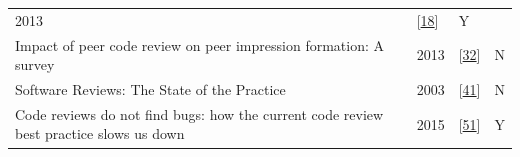 \documentclass[]{book}
\begin{document}
\begin{longtable}[]{@{}llll@{}}
\begin{minipage}[t]{0.04\columnwidth}
2013\strut
\end{minipage} & \begin{minipage}[t]{0.16\columnwidth}\raggedright\strut
{[}\protect\hyperlink{ref-baysal2013influence}{18}{]}\strut
\end{minipage} & \begin{minipage}[t]{0.12\columnwidth}\raggedright\strut
Y\strut
\end{minipage}\tabularnewline
\begin{minipage}[t]{0.56\columnwidth}\raggedright\strut
Impact of peer code review on peer impression formation: A survey\strut
\end{minipage} & \begin{minipage}[t]{0.04\columnwidth}\raggedright\strut
2013\strut
\end{minipage} & \begin{minipage}[t]{0.16\columnwidth}\raggedright\strut
{[}\protect\hyperlink{ref-bosu2013impact}{32}{]}\strut
\end{minipage} & \begin{minipage}[t]{0.12\columnwidth}\raggedright\strut
N\strut
\end{minipage}\tabularnewline
\begin{minipage}[t]{0.56\columnwidth}\raggedright\strut
Software Reviews: The State of the Practice\strut
\end{minipage} & \begin{minipage}[t]{0.04\columnwidth}\raggedright\strut
2003\strut
\end{minipage} & \begin{minipage}[t]{0.16\columnwidth}\raggedright\strut
{[}\protect\hyperlink{ref-ciolkowski2003software}{41}{]}\strut
\end{minipage} & \begin{minipage}[t]{0.12\columnwidth}\raggedright\strut
N\strut
\end{minipage}\tabularnewline
\begin{minipage}[t]{0.56\columnwidth}\raggedright\strut
Code reviews do not find bugs: how the current code review best practice
slows us down\strut
\end{minipage} & \begin{minipage}[t]{0.04\columnwidth}\raggedright\strut
2015\strut
\end{minipage} & \begin{minipage}[t]{0.16\columnwidth}\raggedright\strut
{[}\protect\hyperlink{ref-czerwonka2015code}{51}{]}\strut
\end{minipage} & \begin{minipage}[t]{0.12\columnwidth}\raggedright\strut
Y\strut
\end{minipage}\tabularnewline
\bottomrule
\end{longtable}
\end{document}
